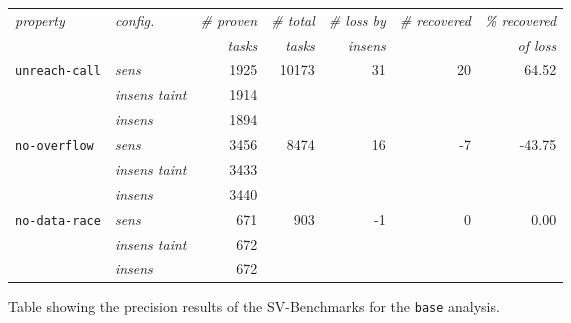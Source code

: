      \begin{figure}
        \centering
        \begin{tabular}{l|l||r|r||r|r|r}
          \textit{property} & \textit{config.} & \textit{\# proven} & \textit{\# total} & \textit{\# loss by} & \textit{\# recovered} & \textit{\% recovered}\\
            &  & \textit{tasks} & \textit{tasks} & \textit{insens} & & \textit{of loss}\\
          \hline
          \texttt{unreach-call} & \textit{sens} & 1925 & 10173 & 31 & 20 & 64.52\\
          & \textit{insens taint} & 1914 & & & & \\
          & \textit{insens} & 1894 & & & & \\
          \hline
          \texttt{no-overflow} & \textit{sens} & 3456 & 8474 & 16 & -7 & -43.75\\
          & \textit{insens taint} & 3433 & & & & \\
          & \textit{insens} & 3440 & & & & \\
          \hline
          \texttt{no-data-race} & \textit{sens} & 671 & 903 & -1 & 0 & 0.00\\
          & \textit{insens taint} & 672 & & & & \\
          & \textit{insens} & 672 & & & & \\
          \hline
        \end{tabular}
        \caption[Table showing the precision results of the SV-Benchmarks for the \texttt{base} analysis.]{Table showing the precision results of the SV-Benchmarks for the \texttt{base} analysis.}
        \label{fig:resultSVbenchTable}
      \end{figure}

